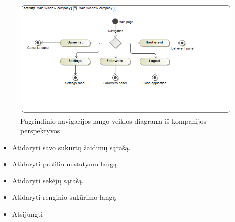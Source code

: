 \documentclass{VUMIFPSkursinis}
\begin{document}
			\begin{figure}[H]
				\centering
				\includegraphics[scale=0.5]{img/MainWindowCompany}
				\caption{Pagrindinio navigacijos lango veiklos diagrama iš kompanijos perspektyvos}
				\label{img:MainWindowCompany}
			\end{figure}
				\renewcommand{\labelitemi}{$\bullet$}
				\begin{itemize}
					\item Atidaryti savo sukurtų žaidimų sąrašą.
					\item Atidaryti profilio nustatymo langą.
					\item Atidaryti sekėjų sąrašą.
					\item Atidaryti renginio sukūrimo langą
					\item Atsijungti
				\end{itemize}
\end{document}
